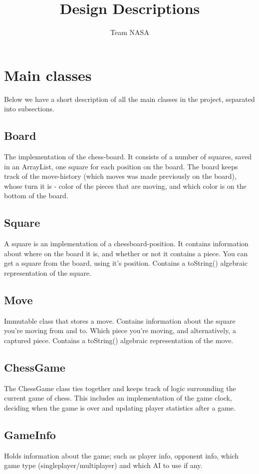 \documentclass{article}
\title{Design Descriptions}
\author{Team NASA}
\date{}
\begin{document}
\maketitle

\section {Main classes}
Below we have a short description of all the main classes in the project, separated into subsections.

\subsection {Board}
The implementation of the chess-board. It consists of a number of squares, saved in an ArrayList, one square for each position on the board. The board keeps track of the move-history (which moves was made previously on the board), whose turn it is - color of the pieces that are moving, and which color is on the bottom of the board. 

\subsection {Square}
A square is an implementation of a chessboard-position. It contains information about where on the board it is, and whether or not it contains a piece. You can get a square from the board, using it’s position. Contains a toString() algebraic representation of the square.

\subsection {Move}
Immutable class that stores a move. Contains information about the square you’re moving from and to. Which piece you’re moving, and alternatively, a captured piece. Contains a toString() algebraic representation of the move.

\subsection {ChessGame}
The ChessGame class ties together and keeps track of logic surrounding the current game of chess. This includes an 
implementation of the game clock, deciding when the game is over and updating player statistics after a game.

\subsection {GameInfo}
Holds information about the game; such as player info, opponent info, which game type (singleplayer/multiplayer) and which AI to use if any.
\end{document}
